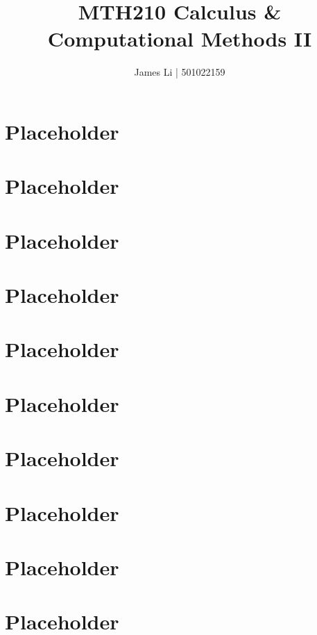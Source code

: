 \documentclass[a4paper]{article}
\title{MTH210 Calculus \& Computational Methods II}
\author{James Li | 501022159}
\date{}
\begin{document}
  \maketitle
  \tableofcontents
  \newpage
  \section{Placeholder} 
  \section{Placeholder} 
  \section{Placeholder} 
  \section{Placeholder} 
  \section{Placeholder} 
  \section{Placeholder} 
  \section{Placeholder} 
  \section{Placeholder} 
  \section{Placeholder} 
  \section{Placeholder} 
\end{document}
